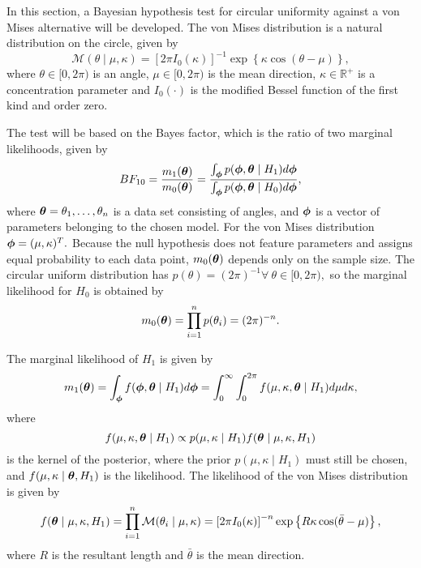 In this section, a Bayesian hypothesis test for circular uniformity against a von Mises alternative will be developed. The von Mises distribution is a natural distribution on the circle, given by
\begin{equation}
\mathcal{M} (\theta \mid \mu, \kappa) = \left[ 2 \pi I_0 (\kappa) \right]^{-1} \exp \left\{ \kappa \cos (\theta - \mu) \right\},
\end{equation}
where \( \theta \in [0, 2\pi) \) is an angle, \( \mu \in [0, 2 \pi) \) is the mean direction, \( \kappa \in \mathbb{R}^+ \) is a concentration parameter and \( I_0(\cdot) \) is the modified Bessel function of the first kind and order zero.

The test will be based on the Bayes factor, which is the ratio of two marginal likelihoods, given by
\begin{equation}
BF_{10} = \frac{ m_1( \boldsymbol{\theta} ) }{ m_0( \boldsymbol{\theta} ) } = \frac{\int_{\boldsymbol{\phi}} p(\boldsymbol{\phi}, \boldsymbol{\theta} \mid H_1)  d\boldsymbol{\phi}}{\int_{\boldsymbol{\phi}} p(\boldsymbol{\phi}, \boldsymbol{\theta} \mid H_0)  d\boldsymbol{\phi}},
\end{equation}
where \( \boldsymbol{\theta} = \theta_1, \dots, \theta_n \) is a data set consisting of angles, and \( \boldsymbol{\phi} \) is a vector of parameters belonging to the chosen model. For the von Mises distribution \( \boldsymbol{\phi} =  ( \mu, \kappa )^T.\) Because the null hypothesis does not feature parameters and assigns equal probability to each data point, \( m_0(\boldsymbol{\theta}) \) depends only on the sample size. The circular uniform distribution has \( p(\theta ) = (2 \pi )^{-1} \forall ~ \theta \in [0, 2\pi),\) so the marginal likelihood for \(H_0\) is obtained by
\begin{equation}
m_0 (\boldsymbol{\theta}) = \prod_{i = 1}^n p(\theta_i) = (2 \pi )^{-n}.
\end{equation}


The marginal likelihood of \( H_1 \) is given by
\begin{equation}
m_1(\boldsymbol{\theta}) = \int_{\boldsymbol{\phi}} f(\boldsymbol{\phi}, \boldsymbol{\theta} \mid H_1)  d\boldsymbol{\phi} = \int_0^{\infty}  \int_0^{2\pi} f(\mu, \kappa, \boldsymbol{\theta} \mid H_1)  d\mu d\kappa,
\end{equation}
where
\begin{equation}
f(\mu, \kappa, \boldsymbol{\theta} \mid  H_1) \propto p(\mu, \kappa \mid H_1) f(\boldsymbol{\theta} \mid \mu, \kappa,  H_1)
\end{equation}
is the kernel of the posterior, where the prior \( p(\mu, \kappa \mid H_1) \) must still be chosen, and \( f(\mu, \kappa \mid \boldsymbol{\theta},  H_1) \) is the likelihood. The likelihood of the von Mises distribution is given by
\begin{equation}
f(\boldsymbol{\theta} \mid \mu, \kappa,  H_1) = \prod_{i = 1}^n \mathcal{M} (\theta_i \mid \mu, \kappa) = \left[ 2 \pi I_0 (\kappa) \right]^{-n} \exp \left\{ R \kappa \cos (\bar{\theta} - \mu) \right\},
\end{equation}
where \( R \) is the resultant length and \( \bar{\theta} \) is the mean direction.

